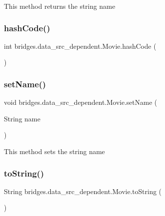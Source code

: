 This method returns the string name \hypertarget{classbridges_1_1data__src__dependent_1_1_movie_a20fffd543345ecc7b171d3ccccffc882}{}\label{classbridges_1_1data__src__dependent_1_1_movie_a20fffd543345ecc7b171d3ccccffc882} 
\subsubsection{\texorpdfstring{hash\+Code()}{hashCode()}}
{\footnotesize\ttfamily int bridges.\+data\+\_\+src\+\_\+dependent.\+Movie.\+hash\+Code (\begin{DoxyParamCaption}{ }\end{DoxyParamCaption})}

\hypertarget{classbridges_1_1data__src__dependent_1_1_movie_a1b4a3072962e5d35f035fad21b73f0f1}{}\label{classbridges_1_1data__src__dependent_1_1_movie_a1b4a3072962e5d35f035fad21b73f0f1} 
\subsubsection{\texorpdfstring{set\+Name()}{setName()}}
{\footnotesize\ttfamily void bridges.\+data\+\_\+src\+\_\+dependent.\+Movie.\+set\+Name (\begin{DoxyParamCaption}\item[{String}]{name }\end{DoxyParamCaption})}

This method sets the string name \hypertarget{classbridges_1_1data__src__dependent_1_1_movie_a99d2b0845c4cbbbc141d38b5518704c6}{}\label{classbridges_1_1data__src__dependent_1_1_movie_a99d2b0845c4cbbbc141d38b5518704c6} 
\subsubsection{\texorpdfstring{to\+String()}{toString()}}
{\footnotesize\ttfamily String bridges.\+data\+\_\+src\+\_\+dependent.\+Movie.\+to\+String (\begin{DoxyParamCaption}{ }\end{DoxyParamCaption})}

